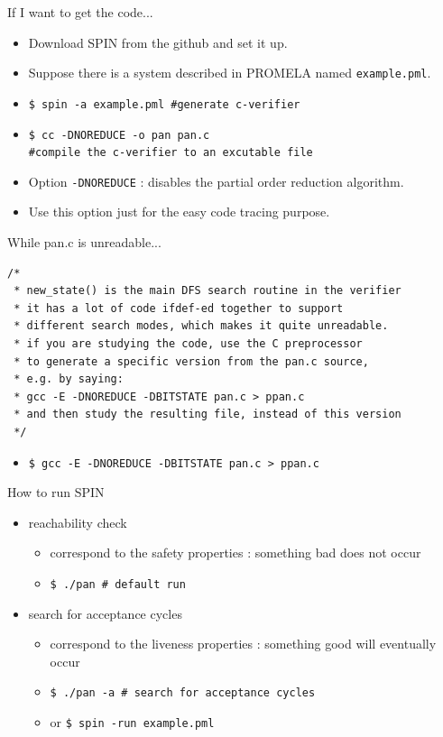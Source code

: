 \documentclass[12pt]{beamer}
\newcommand{\code}[1]{\texttt{#1}}
\begin{document}
\begin{frame}{If I want to get the code...}
	\begin{itemize}
		\item Download SPIN from the github and set it up.
		\item Suppose there is a system described in PROMELA named \code{example.pml}.
		\item \code{\$ spin -a example.pml   \hspace{1cm}\#generate c-verifier}
		\item \code{\$ cc -DNOREDUCE -o pan pan.c} \\ \code{\#compile the c-verifier to an excutable file}
		\item Option \code{-DNOREDUCE} : disables the partial order reduction algorithm.
		\item Use this option just for the easy code tracing purpose.
	\end{itemize}
\end{frame}

\begin{frame}[fragile]{While pan.c is unreadable...}

\begin{lstlisting}[basicstyle=\footnotesize\ttfamily]
/*
 * new_state() is the main DFS search routine in the verifier
 * it has a lot of code ifdef-ed together to support
 * different search modes, which makes it quite unreadable.
 * if you are studying the code, use the C preprocessor
 * to generate a specific version from the pan.c source,
 * e.g. by saying:
 * gcc -E -DNOREDUCE -DBITSTATE pan.c > ppan.c
 * and then study the resulting file, instead of this version
 */\end{lstlisting}
 	\begin{itemize}
 		\item \code{\$ gcc -E -DNOREDUCE -DBITSTATE pan.c > ppan.c}
 	\end{itemize}
\end{frame}

\begin{frame}{How to run SPIN}
	\begin{itemize}
		\item reachability check
		\begin{itemize}
			\item correspond to the safety properties : something bad does not occur
			\item \code{\$ ./pan \hspace{1cm} \# default run}
		\end{itemize}
		\item search for acceptance cycles
		\begin{itemize}
			\item correspond to the liveness properties : something good will eventually occur
			\item \code{\$ ./pan -a \hspace{1cm} \# search for acceptance cycles}
			\item or \code{\$ spin -run example.pml}
		\end{itemize}
	\end{itemize}
\end{frame}
\end{document}
